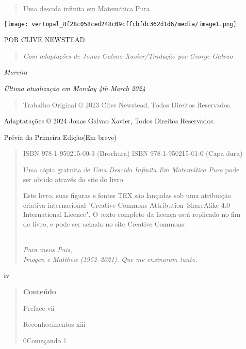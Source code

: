 \documentclass[
]{article}
\author{}
\date{}
\begin{document}
\begin{quote}
Uma descida infinita em Matemática Pura
\end{quote}

\texttt{[image: vertopal\_8f28c058ced248c09cffcbfdc362d1d6/media/image1.png]}

POR CLIVE NEWSTEAD

\begin{quote}
\emph{Com adaptações de Jonas Galvao Xavier/Tradução por George Galvao}
\end{quote}

\emph{Moreira}

\emph{Última atualização em Monday 4th March 2024}

\begin{quote}
Trabalho Original © 2023 Clive Newstead, Todos Direitos Reservados.
\end{quote}

Adaptatações © 2024 Jonas Galvao Xavier, Todos Direitos Reservados.

Prévia da Primeira Edição(Em breve)

\begin{quote}
ISBN 978-1-950215-00-3 (Brochura) ISBN 978-1-950215-01-0 (Capa dura)

Uma cópia gratuita de \emph{Uma Descida Infinita Em Matemática Pura}
pode ser obtido através do site do livro:

Este livro, suas figuras e fontes TEX são lançadas sob uma atribuição
criativa internacional "Creative Commons Attribution--ShareAlike 4.0
International Licence". O texto completo da licença está replicado no
fim do livro, e pode ser achada no site Creative Commons:\\
\strut \\
\emph{Para meus Pais,}\\
\emph{Imogen e Matthew (1952--2021),} \emph{Que me ensinaram tanto.}
\end{quote}

iv

\begin{quote}
\textbf{Conteúdo}

Preface vii

Reconhecimentos xiii

0Começando 1
\end{quote}
\end{document}
